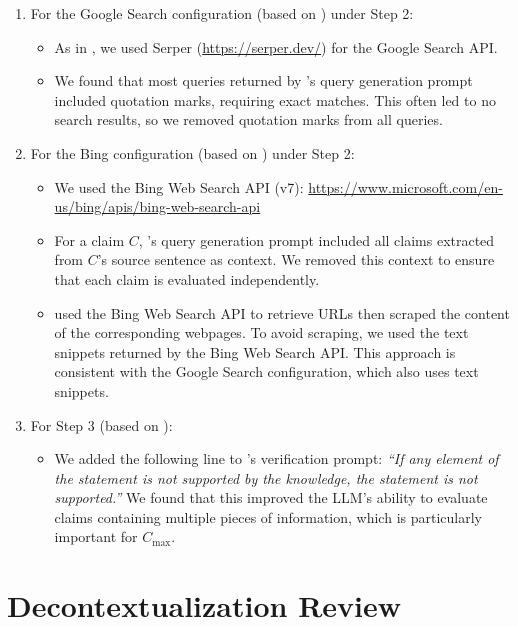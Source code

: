 \begin{enumerate}
\item For the Google Search configuration (based on \citealp{wei:2024}) under Step 2: 
\begin{itemize}
    \item As in \citeauthor{wei:2024}, we used Serper (\url{https://serper.dev/}) for the Google Search API.
    \item We found that most queries returned by \citeauthor{wei:2024}’s query generation prompt included quotation marks, requiring exact matches. This often led to no search results, so we removed quotation marks from all queries.
\end{itemize}

\item For the Bing configuration (based on \citealp{li:2024}) under Step 2:
\begin{itemize}
    \item We used the Bing Web Search API (v7): \url{https://www.microsoft.com/en-us/bing/apis/bing-web-search-api}
    \item For a claim $C$, \citeauthor{li:2024}’s query generation prompt included all claims extracted from $C$'s source sentence as context. We removed this context to ensure that each claim is evaluated independently.
    \item \citeauthor{li:2024} used the Bing Web Search API to retrieve URLs then scraped the content of the corresponding webpages. To avoid scraping, we used the text snippets returned by the Bing Web Search API. This approach is consistent with the Google Search configuration, which also uses text snippets. 
\end{itemize}

\item For Step 3 (based on \citealp{wei:2024}):
\begin{itemize}
    \item We added the following line to \citeauthor{wei:2024}’s verification prompt: \textit{``If any element of the statement is not supported by the knowledge, the statement is not supported.''} We found that this improved the LLM’s ability to evaluate claims containing multiple pieces of information, which is particularly important for $C_{\max}$.
\end{itemize}
\end{enumerate}

\section{Decontextualization Review}
\label{app:decontext_review}

